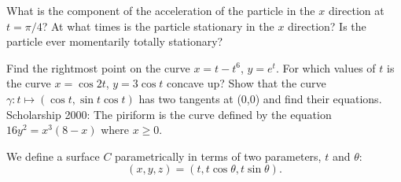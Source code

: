 \begin{questions}
            \begin{parts}
              \parA What is the component of the acceleration of the particle in the $ x $ direction at $ t = \pi/4 $?
              \parA At what times is the particle stationary in the $ x $ direction?
              \parM Is the particle ever momentarily totally stationary?
            \end{parts}
  \questioE Find the rightmost point on the curve $ x = t - t^6 $, $ y = e^t $.
  \questioE For which values of $ t $ is the curve $ x = \cos 2t $, $ y = 3\cos t $ concave up?
  \questioS Show that the curve $ \gamma : t \mapsto (\cos t, \sin t \cos t) $ has two tangents at (0,0)
            and find their equations.
  \questioS Scholarship 2000: The piriform is the curve defined by the equation $ 16y^2 = x^3(8-x) $ where $ x \geq 0 $.
  \questioO We define a surface $ C $ parametrically in terms of two parameters, $ t $ and $ \theta $:
            \begin{displaymath}
              (x,y,z) = (t, t \cos \theta, t \sin \theta).
            \end{displaymath}
\end{questions}
